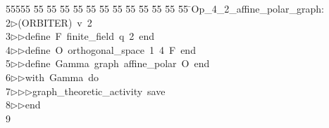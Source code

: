 %
%
\begin{tabbing}
55555 \= 55 \= 55 \= 55 \= 55 \= 55 \= 55 \= 55 \= 55 \= 55 \= 55 \= 55 \= 55 \= \>Op\_4\_2\_affine\_polar\_graph:\\[0pt]
2\>$\triangleright$\>(ORBITER)\ v\ 2\ \\[0pt]
3\>$\triangleright$\>$\triangleright$\>define\ F\ finite\_field\ q\ 2\ end\ \\[0pt]
4\>$\triangleright$\>$\triangleright$\>define\ O\ orthogonal\_space\ 1\ 4\ F\ end\ \\[0pt]
5\>$\triangleright$\>$\triangleright$\>define\ Gamma\ graph\ affine\_polar\ O\ end\ \\[0pt]
6\>$\triangleright$\>$\triangleright$\>with\ Gamma\ do\ \\[0pt]
7\>$\triangleright$\>$\triangleright$\>$\triangleright$\>graph\_theoretic\_activity\ save\ \\[0pt]
8\>$\triangleright$\>$\triangleright$\>end\\[0pt]
9\>\end{tabbing}
